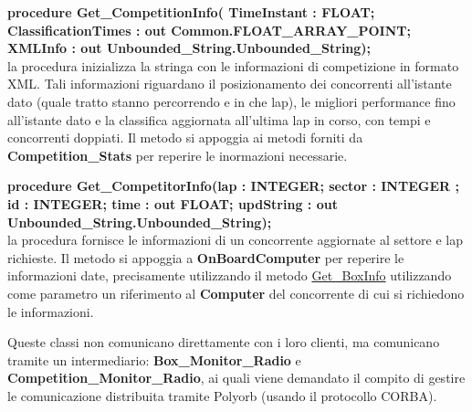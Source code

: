 \begin{description}
\item{\textbf{procedure Get\_CompetitionInfo( TimeInstant : FLOAT; ClassificationTimes : out Common.FLOAT\_ARRAY\_POINT; XMLInfo : out Unbounded\_String.Unbounded\_String);}}\\
la procedura inizializza la stringa con le informazioni di competizione in formato XML. Tali informazioni riguardano il posizionamento
dei concorrenti all'istante dato (quale tratto stanno percorrendo e in che lap), le migliori performance fino all'istante dato e la classifica
aggiornata all'ultima lap in corso, con tempi e concorrenti doppiati. Il metodo si appoggia ai metodi forniti da \textbf{Competition\_Stats}
per reperire le inormazioni necessarie.
\item{\textbf{procedure Get\_CompetitorInfo(lap : INTEGER; sector : INTEGER ; id : INTEGER; time : out FLOAT; updString : out Unbounded\_String.Unbounded\_String);}}\\
la procedura fornisce le informazioni di un concorrente aggiornate al settore e lap richieste. Il metodo si appoggia a \textbf{OnBoardComputer}
per reperire le informazioni date, precisamente utilizzando il metodo \underline{Get\_BoxInfo} utilizzando come parametro un riferimento
al \textbf{Computer} del concorrente di cui si richiedono le informazioni.
\end{description}
Queste classi non comunicano direttamente con i loro clienti, ma comunicano tramite un intermediario: \textbf{Box\_Monitor\_Radio} e 
\textbf{Competition\_Monitor\_Radio}, ai quali viene demandato il compito di gestire le comunicazione distribuita tramite Polyorb (usando
il protocollo CORBA).
\newpage
